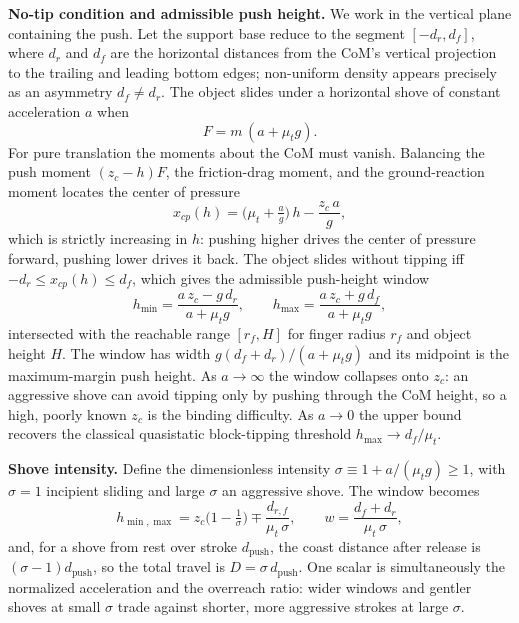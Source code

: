 \documentclass[10pt, conference]{IEEEtran}
\begin{document}
\noindent \textbf{No-tip condition and admissible push height.} We work in the vertical plane containing the push. Let the support base reduce to the segment $[-d_r, d_f]$, where $d_r$ and $d_f$ are the horizontal distances from the CoM's vertical projection to the trailing and leading bottom edges; non-uniform density appears precisely as an asymmetry $d_f \neq d_r$. The object slides under a horizontal shove of constant acceleration $a$ when
\begin{equation}
    F = m\,(a + \mu_t g).
    \label{eq:shove_force}
\end{equation}
For pure translation the moments about the CoM must vanish. Balancing the push moment $(z_c - h)F$, the friction-drag moment, and the ground-reaction moment locates the center of pressure
\begin{equation}
    x_{cp}(h) = \Big(\mu_t + \tfrac{a}{g}\Big)\,h - \frac{z_c\, a}{g},
    \label{eq:cop}
\end{equation}
which is strictly increasing in $h$: pushing higher drives the center of pressure forward, pushing lower drives it back. The object slides without tipping iff $-d_r \le x_{cp}(h) \le d_f$, which gives the admissible push-height window
\begin{equation}
    h_{\min} = \frac{a\,z_c - g\,d_r}{a + \mu_t g}, \qquad
    h_{\max} = \frac{a\,z_c + g\,d_f}{a + \mu_t g},
    \label{eq:hwindow}
\end{equation}
intersected with the reachable range $[r_f, H]$ for finger radius $r_f$ and object height $H$. The window has width $g(d_f + d_r)/(a + \mu_t g)$ and its midpoint is the maximum-margin push height. As $a \to \infty$ the window collapses onto $z_c$: an aggressive shove can avoid tipping only by pushing through the CoM height, so a high, poorly known $z_c$ is the binding difficulty. As $a \to 0$ the upper bound recovers the classical quasistatic block-tipping threshold $h_{\max} \to d_f/\mu_t$.

\noindent \textbf{Shove intensity.} Define the dimensionless intensity $\sigma \equiv 1 + a/(\mu_t g) \ge 1$, with $\sigma = 1$ incipient sliding and large $\sigma$ an aggressive shove. The window becomes
\begin{equation}
    h_{\min,\max} = z_c\Big(1-\tfrac{1}{\sigma}\Big) \mp \frac{d_{r,f}}{\mu_t\,\sigma}, \qquad
    w = \frac{d_f+d_r}{\mu_t\,\sigma},
    \label{eq:sigma_window}
\end{equation}
and, for a shove from rest over stroke $d_{\mathrm{push}}$, the coast distance after release is $(\sigma-1)d_{\mathrm{push}}$, so the total travel is $D = \sigma\,d_{\mathrm{push}}$. One scalar is simultaneously the normalized acceleration and the overreach ratio: wider windows and gentler shoves at small $\sigma$ trade against shorter, more aggressive strokes at large $\sigma$.
\end{document}

